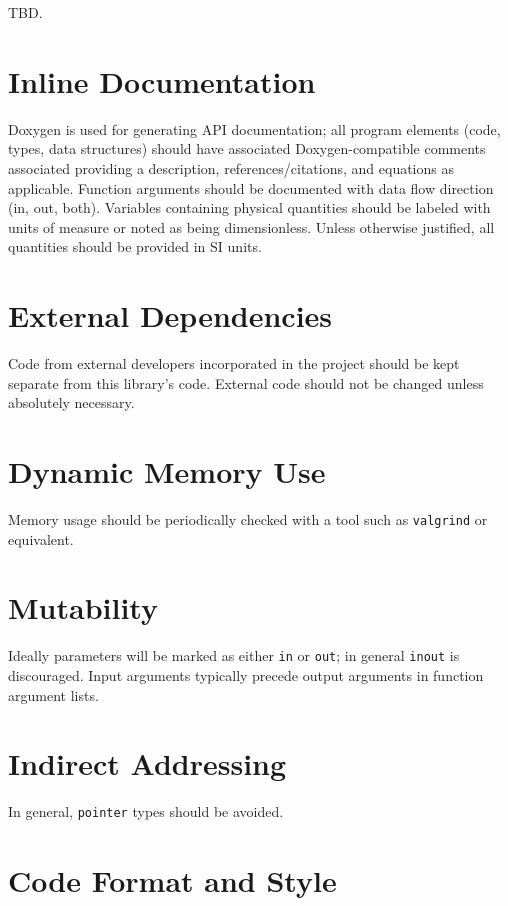 TBD.

\section{Inline Documentation}

Doxygen is used for generating API documentation; all program elements (code, types, data structures) should have associated Doxygen-compatible comments associated providing a description, references/citations, and equations as applicable. Function arguments should be documented with data flow direction (in, out, both). Variables containing physical quantities should be labeled with units of measure or noted as being dimensionless. Unless otherwise justified, all quantities should be provided in SI units.

\section{External Dependencies}

Code from external developers incorporated in the project should be kept separate from this library's code. External code should not be changed unless absolutely necessary.

\section{Dynamic Memory Use}

Memory usage should be periodically checked with a tool such as \texttt{valgrind} or equivalent.

\section{Mutability}

Ideally parameters will be marked as either \texttt{in} or \texttt{out}; in general \texttt{inout} is discouraged.  Input arguments typically precede output arguments in function argument lists.

\section{Indirect Addressing}

In general, \texttt{pointer} types should be avoided.

\section{Code Format and Style}

